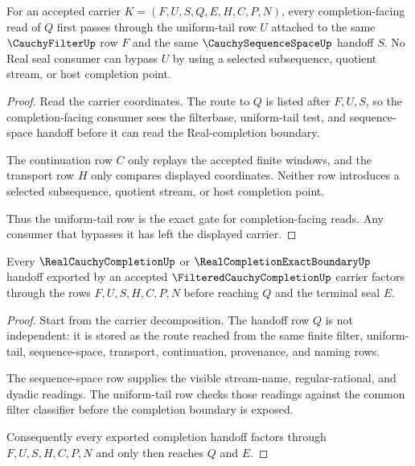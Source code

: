\begin{theorem}\label{thm:filtered-cauchy-completion-uniform-tail-exactness}
For an accepted carrier $K=(F,U,S,Q,E,H,C,P,N)$, every completion-facing read
of $Q$ first passes through the uniform-tail row $U$ attached to the same
$\CauchyFilterUp$ row $F$ and the same $\CauchySequenceSpaceUp$ handoff $S$.
No Real seal consumer can bypass $U$ by using a selected subsequence, quotient
stream, or host completion point.
\end{theorem}
\begin{proof}
Read the carrier coordinates. The route to $Q$ is listed after $F,U,S$, so the
completion-facing consumer sees the filterbase, uniform-tail test, and
sequence-space handoff before it can read the Real-completion boundary.

The continuation row $C$ only replays the accepted finite windows, and the
transport row $H$ only compares displayed coordinates. Neither row introduces
a selected subsequence, quotient stream, or host completion point.

Thus the uniform-tail row is the exact gate for completion-facing reads. Any
consumer that bypasses it has left the displayed carrier.
\end{proof}

\begin{theorem}\label{thm:filtered-cauchy-completion-handoff-factorization}
Every $\RealCauchyCompletionUp$ or $\RealCompletionExactBoundaryUp$ handoff
exported by an accepted $\FilteredCauchyCompletionUp$ carrier factors through
the rows $F,U,S,H,C,P,N$ before reaching $Q$ and the terminal seal $E$.
\end{theorem}
\begin{proof}
Start from the carrier decomposition. The handoff row $Q$ is not independent:
it is stored as the route reached from the same finite filter, uniform-tail,
sequence-space, transport, continuation, provenance, and naming rows.

The sequence-space row supplies the visible stream-name, regular-rational, and
dyadic readings. The uniform-tail row checks those readings against the common
filter classifier before the completion boundary is exposed.

Consequently every exported completion handoff factors through
$F,U,S,H,C,P,N$ and only then reaches $Q$ and $E$.
\end{proof}


